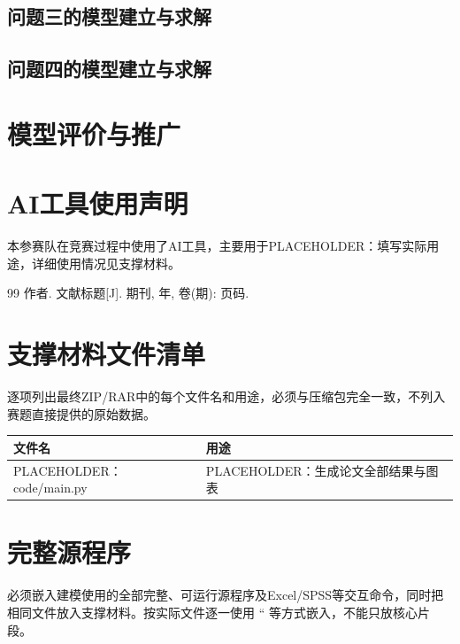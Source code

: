 \documentclass[withoutpreface]{cumcmthesis}
\begin{document}
\subsection{问题三的模型建立与求解}

\subsection{问题四的模型建立与求解}

\section{模型评价与推广}

\providecommand{\CumcmAINotUsed}{\section*{AI工具使用声明}本参赛队在竞赛过程中未使用任何AI工具。}
\providecommand{\CumcmAIUsed}[1]{\section*{AI工具使用声明}本参赛队在竞赛过程中使用了AI工具，主要用于#1，详细使用情况见支撑材料。}
\CumcmAIUsed{PLACEHOLDER：填写实际用途}

\begin{thebibliography}{99}
 作者. 文献标题[J]. 期刊, 年, 卷(期): 页码.
\end{thebibliography}

\begin{appendices}
\section{支撑材料文件清单}
逐项列出最终ZIP/RAR中的每个文件名和用途，必须与压缩包完全一致，不列入赛题直接提供的原始数据。

\begin{center}
\begin{tabular}{ll}
\toprule
文件名 & 用途\\
\midrule
PLACEHOLDER：code/main.py & PLACEHOLDER：生成论文全部结果与图表\\
\bottomrule
\end{tabular}
\end{center}

\section{完整源程序}
必须嵌入建模使用的全部完整、可运行源程序及Excel/SPSS等交互命令，同时把相同文件放入支撑材料。按实际文件逐一使用 `` 等方式嵌入，不能只放核心片段。

\end{appendices}
\end{document}
